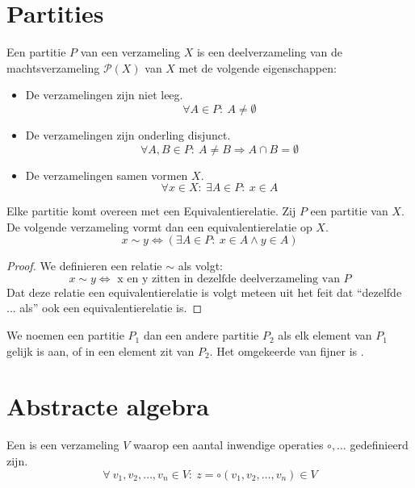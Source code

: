 \documentclass[main.tex]{subfiles}
\begin{document}
\section{Partities}
\label{sec:partities}

\begin{de}
  \label{de:partitie}
  Een partitie $P$ van een verzameling $X$ is een deelverzameling van de machtsverzameling $\mathcal {P}(X)$ van $X$ met de volgende eigenschappen:
  \begin{itemize}
  \item De verzamelingen zijn niet leeg.
    \[ \forall A \in P:\ A \neq \emptyset \]
  \item De verzamelingen zijn onderling disjunct.
    \[ \forall A,B \in P:\ A \neq B \Rightarrow A \cap B = \emptyset \]
  \item De verzamelingen samen vormen $X$.
    \[ \forall x \in X:\ \exists A \in P:\ x \in A \]
  \end{itemize}
\end{de}

\begin{st}
  \label{st:verband-partitie-equivalentierelatie}
  Elke partitie komt overeen met een Equivalentierelatie. Zij $P$ een partitie van $X$.
  De volgende verzameling vormt dan een equivalentierelatie op $X$.
  \[ x \sim y \Leftrightarrow (\exists A \in P:\ x \in A \wedge y \in A )\]

  \begin{proof}
    We definieren een relatie $\sim$ als volgt:
    \[
    x \sim y \Leftrightarrow \text{ x en y zitten in dezelfde deelverzameling van } P
    \]
    Dat deze relatie een equivalentierelatie is volgt meteen uit het feit dat ``dezelfde ... als'' ook een equivalentierelatie is.
  \end{proof}
\end{st}

\begin{de}
  We noemen een partitie $P_{1}$  dan een andere partitie $P_{2}$ als elk element van $P_{1}$ gelijk is aan, of in een element zit van $P_{2}$.
  Het omgekeerde van fijner is .
\end{de}

\section{Abstracte algebra}
\label{sec:abstracte-algebra}

\begin{de}
  Een  is een verzameling $V$ waarop een aantal inwendige operaties $\circ,\ldots$ gedefinieerd zijn.
  \[ \forall\ v_1,v_2,\ldots,v_n \in V:\ z = \circ(v_1,v_2,\ldots,v_n) \in V \]
\end{de}
\end{document}
